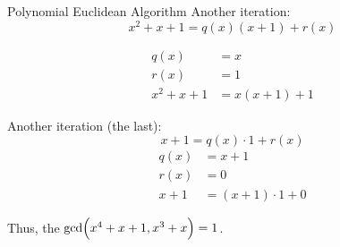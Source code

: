 \begin{example}[Lecture 3]{Polynomial Euclidean Algorithm}
    Another iteration:
    \begin{equation*}
      x^{2} + x + 1 = q(x) (x+1) + r(x)
    \end{equation*}
    \begin{center}
    \end{center}
    \begin{align*}
      q(x) &= x \\
      r(x) &= 1 \\
      x^{2} + x + 1 &= x (x+1) + 1
    \end{align*}

    Another iteration (the last):
    \begin{equation*}
      x+1 = q(x) \cdot 1 + r(x)
    \end{equation*}
    \begin{align*}
      q(x) &= x+1 \\
      r(x) &= 0 \\
      x+1 &= (x+1) \cdot 1 + 0
    \end{align*}

    Thus, the $\gcd \Bigl( x^{4} + x + 1, x^{3} + x \Bigr) = 1$.
\end{example}

